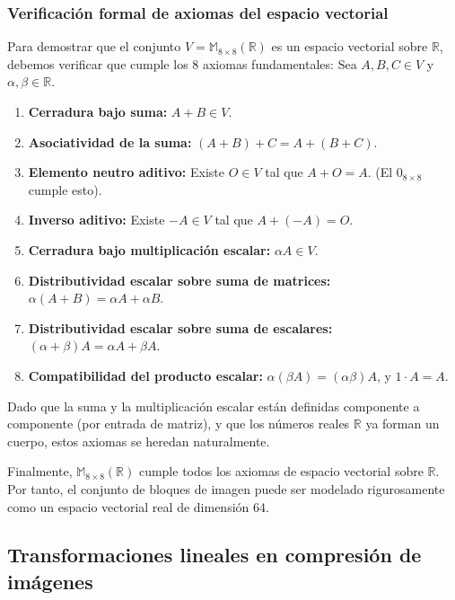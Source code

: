 \documentclass[8pt,a4paper]{article}
\theoremstyle{definition}
\theoremstyle{remark}
\begin{document}
\begin{multicols}{2}
            \subsubsection{Verificación formal de axiomas del espacio vectorial}
    
            Para demostrar que el conjunto \( V = \mathbb{M}_{8 \times 8}(\mathbb{R}) \) es un espacio vectorial sobre \( \mathbb{R} \), debemos verificar que cumple los 8 axiomas fundamentales: Sea \( A, B, C \in V \) y \( \alpha, \beta \in \mathbb{R} \).
        
            \begin{enumerate}
            \item \textbf{Cerradura bajo suma:} \( A + B \in V \).
            \item \textbf{Asociatividad de la suma:} \( (A + B) + C = A + (B + C) \).
            \item \textbf{Elemento neutro aditivo:} Existe \( O \in V \) tal que \( A + O = A \). (El \( 0_{8\times8} \) cumple esto).
            \item \textbf{Inverso aditivo:} Existe \( -A \in V \) tal que \( A + (-A) = O \).
            \item \textbf{Cerradura bajo multiplicación escalar:} \( \alpha A \in V \).
            \item \textbf{Distributividad escalar sobre suma de matrices:} \( \alpha (A + B) = \alpha A + \alpha B \).
            \item \textbf{Distributividad escalar sobre suma de escalares:} \( (\alpha + \beta) A = \alpha A + \beta A \).
            \item \textbf{Compatibilidad del producto escalar:} \( \alpha (\beta A) = (\alpha \beta) A \), y \( 1 \cdot A = A \).
            \end{enumerate}
        
            Dado que la suma y la multiplicación escalar están definidas componente a componente (por entrada de matriz), y que los números reales \( \mathbb{R} \) ya forman un cuerpo, estos axiomas se heredan naturalmente.
            
            Finalmente, \( \mathbb{M}_{8 \times 8}(\mathbb{R}) \) cumple todos los axiomas de espacio vectorial sobre \( \mathbb{R} \). Por tanto, el conjunto de bloques de imagen puede ser modelado rigurosamente como un espacio vectorial real de dimensión 64.

        \subsection{Transformaciones lineales en compresión de imágenes}


\end{multicols}
\end{document}
